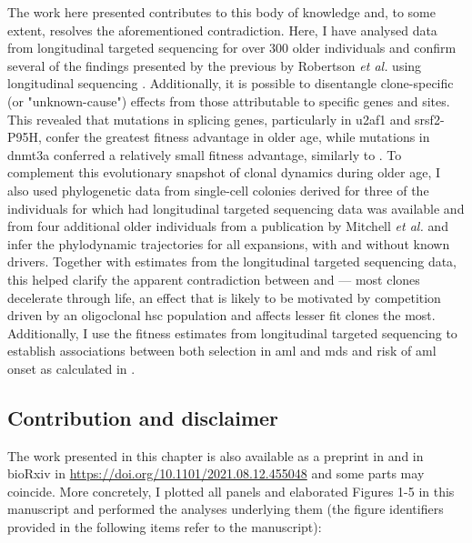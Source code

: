 The work here presented contributes to this body of knowledge and, to some extent, resolves the aforementioned contradiction. Here, I have analysed data from longitudinal targeted sequencing for over 300 older individuals and confirm several of the findings presented by the previous by Robertson \textit{et al.} using longitudinal sequencing \cite{Robertson2021-sw}. Additionally, it is possible to disentangle clone-specific (or "unknown-cause") effects from those attributable to specific genes and sites. This revealed that mutations in splicing genes, particularly in \ac{u2af1} and \ac{srsf2}-P95H, confer the greatest fitness advantage in older age, while mutations in \ac{dnmt3a} conferred a relatively small fitness advantage, similarly to \cite{Robertson2021-sw}. To complement this evolutionary snapshot of clonal dynamics during older age, I also used phylogenetic data from single-cell colonies derived for three of the individuals for which had longitudinal targeted sequencing data was available and from four additional older individuals from a publication by Mitchell \textit{et al.} \cite{Mitchell2021-zl} and infer the phylodynamic trajectories for all expansions, with and without known drivers. Together with estimates from the longitudinal targeted sequencing data, this helped clarify the apparent contradiction between \cite{Robertson2021-sw} and \cite{Watson2020-pz} --- most clones decelerate through life, an effect that is likely to be motivated by competition driven by an oligoclonal \ac{hsc} population and affects lesser fit clones the most. Additionally, I use the fitness estimates from longitudinal targeted sequencing to establish associations between both selection in \ac{aml} and \ac{mds} and risk of \ac{aml} onset as calculated in \cite{Abelson2018-wh}.

\subsection{Contribution and disclaimer}

The work presented in this chapter is also available as a preprint in \cite{Fabre2021-uw} and in bioRxiv in \url{https://doi.org/10.1101/2021.08.12.455048} and some parts may coincide. More concretely, I plotted all panels and elaborated Figures 1-5 in this manuscript and performed the analyses underlying them (the figure identifiers provided in the following items refer to the manuscript):

